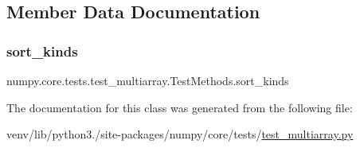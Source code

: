 \subsection{Member Data Documentation}
\mbox{\label{classnumpy_1_1core_1_1tests_1_1test__multiarray_1_1TestMethods_ab03ed8c87928996ba5dd03492caa57f6}} 
\subsubsection{\texorpdfstring{sort\+\_\+kinds}{sort\_kinds}}
{\footnotesize\ttfamily numpy.\+core.\+tests.\+test\+\_\+multiarray.\+Test\+Methods.\+sort\+\_\+kinds\hspace{0.3cm}{\ttfamily [static]}}



The documentation for this class was generated from the following file\+:\begin{DoxyCompactItemize}
\item 
venv/lib/python3./site-\/packages/numpy/core/tests/\hyperlink{core_2tests_2test__multiarray_8py}{test\+\_\+multiarray.\+py}\end{DoxyCompactItemize}

